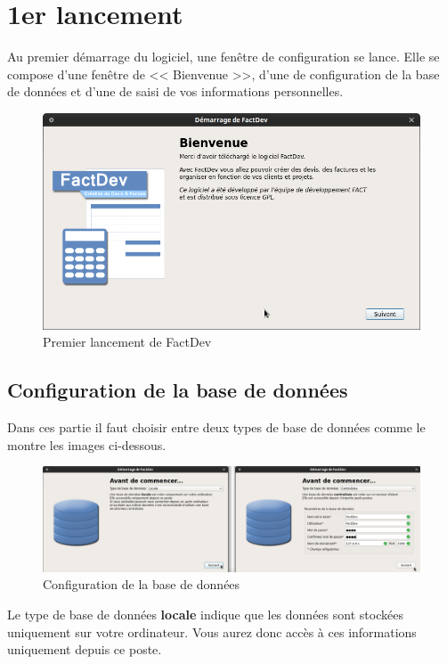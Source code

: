 \chapter{1er lancement}
Au premier d\'emarrage du logiciel, une fen\^etre de configuration se lance.
Elle se compose d'une fen\^etre de << Bienvenue >>, d'une de configuration de la base de donn\'ees et d'une de saisi de vos informations personnelles.

\begin{figure}[H]
	\centering
	\includegraphics[width=12cm]{screens/lancement1.png}
	\caption{Premier lancement de FactDev}
	\label{fig:lancementFactDev}
\end{figure}

\section{Configuration de la base de donn\'ees}
Dans ces partie il faut choisir entre deux types de base de donn\'ees comme le montre les images ci-dessous.
\begin{figure}[H]
	\centering
	\includegraphics[width=15cm]{screens/lancement2.png}
	\caption{Configuration de la base de donn\'ees}
	\label{fig:configurationBaseDeDonnees}
\end{figure}
Le type de base de donn\'ees \textbf{locale} indique que les donn\'ees sont stock\'ees uniquement sur votre ordinateur. Vous aurez donc acc\`es \`a ces informations uniquement depuis ce poste. 

